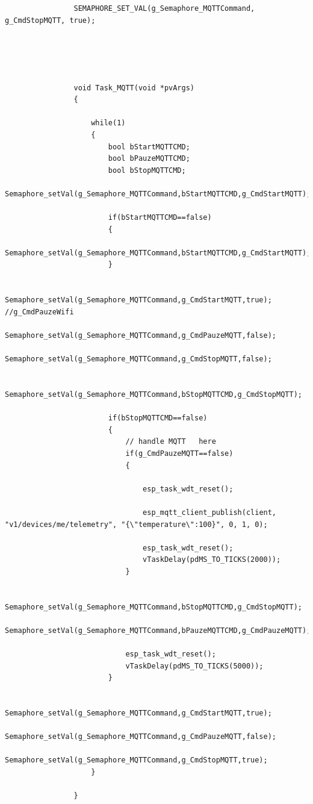 		
		\lstset{language=java}
		
		\begin{Aanpassen}
			\begin{lstlisting}
				SEMAPHORE_SET_VAL(g_Semaphore_MQTTCommand, g_CmdStopMQTT, true);
				
				
				
				
			\end{lstlisting}
		\end{Aanpassen}
		
		
		\lstset{language=java}
		
		\begin{Aanpassen}
			\begin{lstlisting}
				void Task_MQTT(void *pvArgs)
				{
					
					while(1)
					{
						bool bStartMQTTCMD;
						bool bPauzeMQTTCMD;
						bool bStopMQTTCMD;
						Semaphore_setVal(g_Semaphore_MQTTCommand,bStartMQTTCMD,g_CmdStartMQTT);
						
						if(bStartMQTTCMD==false)
						{
							Semaphore_setVal(g_Semaphore_MQTTCommand,bStartMQTTCMD,g_CmdStartMQTT);
						}
						
						Semaphore_setVal(g_Semaphore_MQTTCommand,g_CmdStartMQTT,true); //g_CmdPauzeWifi
						Semaphore_setVal(g_Semaphore_MQTTCommand,g_CmdPauzeMQTT,false);
						Semaphore_setVal(g_Semaphore_MQTTCommand,g_CmdStopMQTT,false);
						
						Semaphore_setVal(g_Semaphore_MQTTCommand,bStopMQTTCMD,g_CmdStopMQTT);
						
						if(bStopMQTTCMD==false)
						{
							// handle MQTT   here
							if(g_CmdPauzeMQTT==false)
							{
								
								esp_task_wdt_reset();
								
								esp_mqtt_client_publish(client, "v1/devices/me/telemetry", "{\"temperature\":100}", 0, 1, 0);
								
								esp_task_wdt_reset();
								vTaskDelay(pdMS_TO_TICKS(2000));
							}
							
							Semaphore_setVal(g_Semaphore_MQTTCommand,bStopMQTTCMD,g_CmdStopMQTT);
							Semaphore_setVal(g_Semaphore_MQTTCommand,bPauzeMQTTCMD,g_CmdPauzeMQTT);
							
							esp_task_wdt_reset();
							vTaskDelay(pdMS_TO_TICKS(5000));
						}
						
						Semaphore_setVal(g_Semaphore_MQTTCommand,g_CmdStartMQTT,true);
						Semaphore_setVal(g_Semaphore_MQTTCommand,g_CmdPauzeMQTT,false);
						Semaphore_setVal(g_Semaphore_MQTTCommand,g_CmdStopMQTT,true);
					}
					
				}
				
				
				
			\end{lstlisting}
		\end{Aanpassen}
		
